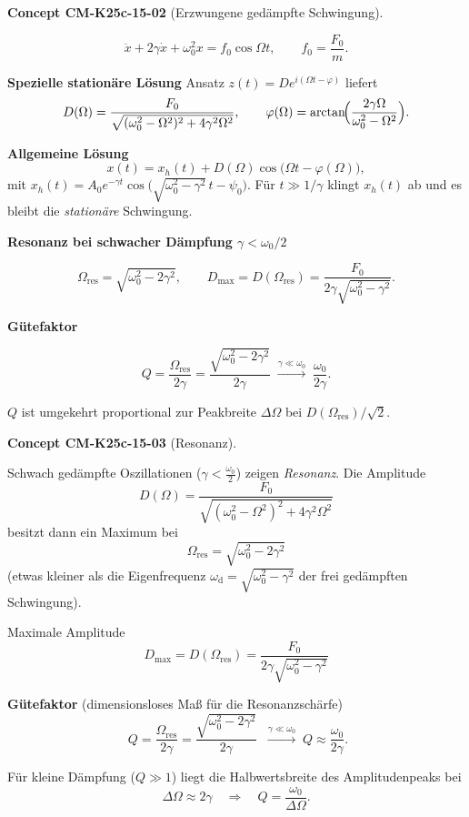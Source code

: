 \documentclass[10pt, letterpaper]{article}
\newcommand{\CustomHeading}[3]{%
  \par\medskip\noindent%
  \textbf{#1 #2} \textnormal{(#3)}.\enskip%
}
\newenvironment{CONC}[2]{\CustomHeading{Concept}{#1}{#2}}{}
\begin{document}
\begin{CONC}{CM-K25c-15-02}{Erzwungene gedämpfte Schwingung}
\[
\ddot x + 2\gamma\dot x + \omega_{0}^{2}x
  = f_{0}\cos\Omega t,
  \qquad
  f_{0}=\frac{F_{0}}{m}.
\]

\textbf{Spezielle stationäre Lösung}  
Ansatz $z(t)=D e^{i(\Omega t-\varphi)}$ liefert  
\[
D(\Omega)=\frac{F_{0}}
               {\sqrt{(\omega_{0}^{2}-\Omega^{2})^{2}+4\gamma^{2}\Omega^{2}}},
\qquad
\varphi(\Omega)=\arctan\!\Bigl(\frac{2\gamma\Omega}
                                      {\omega_{0}^{2}-\Omega^{2}}\Bigr).
\]

\textbf{Allgemeine Lösung}  
\[
x(t)=x_{h}(t)+D(\Omega)\cos\bigl(\Omega t-\varphi(\Omega)\bigr),
\]
mit
\(x_{h}(t)=A_{0}e^{-\gamma t}\cos\bigl(\sqrt{\omega_{0}^{2}-\gamma^{2}}\,t-\psi_{0}\bigr)\).
Für \(t\gg 1/\gamma\) klingt $x_{h}(t)$ ab und es bleibt die \emph{stationäre} Schwingung.

\textbf{Resonanz bei schwacher Dämpfung \(\gamma<\omega_{0}/2\)}

\[
\Omega_{\text{res}}=\sqrt{\omega_{0}^{2}-2\gamma^{2}},
\qquad
D_{\max}=D(\Omega_{\text{res}})
         =\frac{F_{0}}{2\gamma\sqrt{\omega_{0}^{2}-\gamma^{2}}}.
\]

\textbf{Gütefaktor}

\[
Q=\frac{\Omega_{\text{res}}}{2\gamma}
  =\frac{\sqrt{\omega_{0}^{2}-2\gamma^{2}}}{2\gamma}
  \;\stackrel{\gamma\ll\omega_{0}}{\longrightarrow}\;
  \frac{\omega_{0}}{2\gamma}.
\]

$Q$ ist umgekehrt proportional zur Peakbreite
\(\Delta\Omega\) bei $D(\Omega_{\text{res}})/\sqrt{2}$.
\end{CONC}

\begin{CONC}{CM-K25c-15-03}{Resonanz}
Schwach gedämpfte Oszillationen (\(\gamma < \tfrac{\omega_0}{2}\)) zeigen \emph{Resonanz}.  
Die Amplitude 
\[
  D(\Omega)=\frac{F_0}
                 {\sqrt{(\omega_0^{2}-\Omega^{2})^{2}+4\gamma^{2}\Omega^{2}}}
\]
besitzt dann ein Maximum bei
\[
  \boxed{\;\Omega_{\text{res}}
         =\sqrt{\omega_{0}^{2}-2\gamma^{2}}\;}
\]
(etwas kleiner als die Eigenfrequenz  
\(\omega_{\mathrm d}=\sqrt{\omega_{0}^{2}-\gamma^{2}}\)  
der frei gedämpften Schwingung).

Maximale Amplitude
\[
  \boxed{\;
    D_{\max}=D(\Omega_{\text{res}})
            =\frac{F_0}{2\gamma\sqrt{\omega_{0}^{2}-\gamma^{2}}}\;}
\]

\textbf{Gütefaktor} (dimensionsloses Maß für die Resonanzschärfe)
\[
  \boxed{\;
    Q=\frac{\Omega_{\text{res}}}{2\gamma}
      =\frac{\sqrt{\omega_{0}^{2}-2\gamma^{2}}}{2\gamma}\;}
  \;\xrightarrow{\gamma\ll\omega_{0}}\;
  Q\approx\frac{\omega_{0}}{2\gamma}.
\]

Für kleine Dämpfung (\(Q\gg 1\)) liegt die Halbwertsbreite des Amplituden­peaks bei
\[
  \Delta\Omega \approx 2\gamma
  \quad\Longrightarrow\quad
  Q = \frac{\omega_{0}}{\Delta\Omega}.
\]
\end{CONC}
\end{document}
